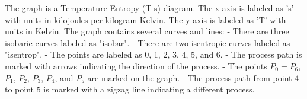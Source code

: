 The graph is a Temperature-Entropy (T-s) diagram. The x-axis is labeled as 's' with units in kilojoules per kilogram Kelvin. The y-axis is labeled as 'T' with units in Kelvin. The graph contains several curves and lines:
- There are three isobaric curves labeled as "isobar".
- There are two isentropic curves labeled as "isentrop".
- The points are labeled as 0, 1, 2, 3, 4, 5, and 6.
- The process path is marked with arrows indicating the direction of the process.
- The points \( P_0 = P_6 \), \( P_1 \), \( P_2 \), \( P_3 \), \( P_4 \), and \( P_5 \) are marked on the graph.
- The process path from point 4 to point 5 is marked with a zigzag line indicating a different process.